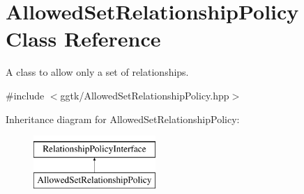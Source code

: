 \hypertarget{classAllowedSetRelationshipPolicy}{}\section{Allowed\+Set\+Relationship\+Policy Class Reference}
\label{classAllowedSetRelationshipPolicy}


A class to allow only a set of relationships.  




{\ttfamily \#include $<$ggtk/\+Allowed\+Set\+Relationship\+Policy.\+hpp$>$}

Inheritance diagram for Allowed\+Set\+Relationship\+Policy\+:\begin{figure}[H]
\begin{center}
\leavevmode
\includegraphics[height=2.000000cm]{classAllowedSetRelationshipPolicy}
\end{center}
\end{figure}
